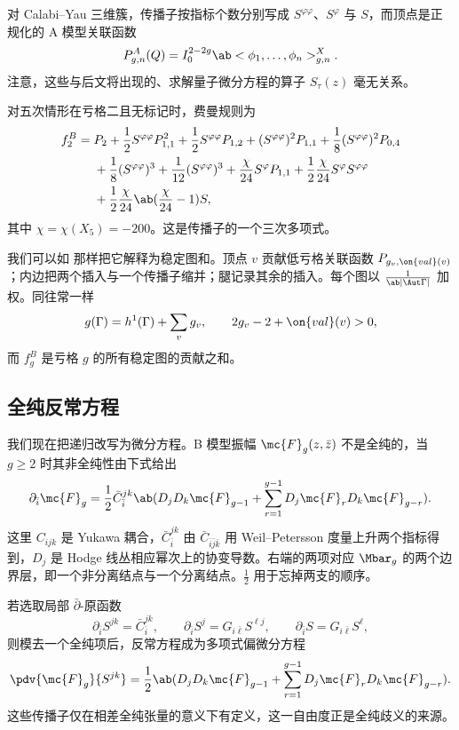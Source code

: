 对 Calabi–Yau 三维簇，传播子按指标个数分别写成 \(S^{\varphi\varphi}\)、\(S^{\varphi}\) 与 \(S\)，而顶点是正规化的 A 模型关联函数
\[ P^A_{g,n}(Q) = I_0^{2-2g}\ab<\phi_1, \ldots, \phi_n>^X_{g,n}. \]
注意，这些与后文将出现的、求解量子微分方程的算子 \(S_{\tau}(z)\) 毫无关系。

\begin{exm}
    对五次情形在亏格二且无标记时，费曼规则为
    \begin{align*}
        f_2^B ={}& P_2 + \frac{1}{2}S^{\varphi\varphi}P_{1,1}^2 + \frac{1}{2}S^{\varphi\varphi}P_{1,2} + (S^{\varphi\varphi})^2 P_{1,1} + \frac{1}{8}(S^{\varphi\varphi})^2 P_{0,4} \\
        &+ \frac{1}{8}(S^{\varphi\varphi})^3 + \frac{1}{12}(S^{\varphi\varphi})^3 + \frac{\chi}{24}S^{\varphi}P_{1,1} + \frac{1}{2}\frac{\chi}{24}S^{\varphi}S^{\varphi\varphi} \\
        &+ \frac{1}{2}\frac{\chi}{24}\ab(\frac{\chi}{24}-1)S,
    \end{align*}
    其中 \(\chi = \chi(X_5) = -200\)。这是传播子的一个三次多项式。
\end{exm}

我们可以如  那样把它解释为稳定图和。顶点 \(v\) 贡献低亏格关联函数 \(P_{g_v, \on{val}(v)}\)；内边把两个插入与一个传播子缩并；腿记录其余的插入。每个图以 \(\frac{1}{\ab|\Aut \Gamma|}\) 加权。同往常一样
\[ g(\Gamma) = h^1(\Gamma) + \sum_v g_v, \qquad 2g_v - 2 + \on{val}(v) > 0, \]
而 \(f_g^B\) 是亏格 \(g\) 的所有稳定图的贡献之和。

\subsection{全纯反常方程}%
\label{sub:The holomorphic anomaly equation}

我们现在把递归改写为微分方程。B 模型振幅 \(\mc{F}_g(z,\bar{z})\) 不是全纯的，当 \(g \geq 2\) 时其非全纯性由下式给出
\[ \partial_{\bar{i}} \mc{F}_g = \frac{1}{2}\bar{C}_{\bar{i}}^{jk}\ab( D_j D_k \mc{F}_{g-1} + \sum_{r=1}^{g-1} D_j \mc{F}_r D_k \mc{F}_{g-r} ). \]
这里 \(C_{ijk}\) 是 Yukawa 耦合，\(\bar{C}_{\bar{i}}^{jk}\) 由 \(\bar{C}_{\bar{i}\bar{j}\bar{k}}\) 用 Weil–Petersson 度量上升两个指标得到，\(D_j\) 是 Hodge 线丛相应幂次上的协变导数。右端的两项对应 \(\Mbar_g\) 的两个边界层，即一个非分离结点与一个分离结点。\(\frac{1}{2}\) 用于忘掉两支的顺序。

若选取局部 \(\bar{\partial}\)-原函数
\[ \partial_{\bar{i}}S^{jk} = \bar{C}_{\bar{i}}^{jk}, \qquad \partial_{\bar{i}}S^j = G_{i\bar{\ell}}S^{\ell j}, \qquad \partial_{\bar{i}}S = G_{i\bar{\ell}}S^{\ell}, \]
则模去一个全纯项后，反常方程成为多项式偏微分方程
\[ \pdv{\mc{F}_g}{S^{jk}} = \frac{1}{2}\ab( D_jD_k \mc{F}_{g-1} + \sum_{r=1}^{g-1} D_j \mc{F}_r D_k \mc{F}_{g-r} ). \]
这些传播子仅在相差全纯张量的意义下有定义，这一自由度正是全纯歧义的来源。

